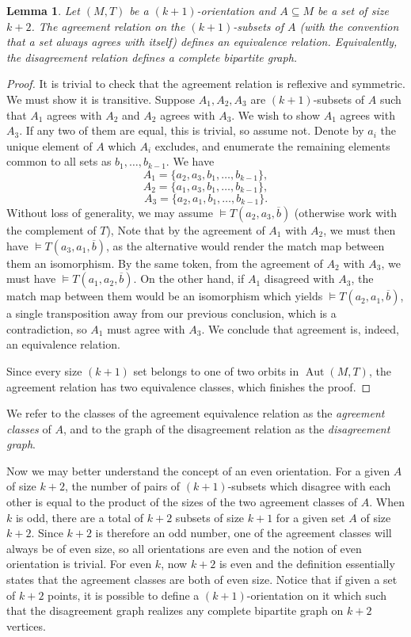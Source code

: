 \documentclass{amsart}
\newtheorem{lemma}[theorem]{Lemma}
\newcommand{\set}[1]{\{#1 \}}
\DeclareMathOperator{\Aut}{Aut}
\begin{document}
\begin{lemma}
    Let $(M, T)$ be a $(k+1)$-orientation and $A \subseteq M$ be a set of size $k+2$. The agreement relation on the $(k+1)$-subsets of $A$ (with the convention that a set always agrees with itself) defines an equivalence relation. Equivalently, the disagreement relation defines a complete bipartite graph.
\end{lemma}
\begin{proof}
    It is trivial to check that the agreement relation is reflexive and symmetric. We must show it is transitive. Suppose $A_1, A_2, A_3$ are $(k+1)$-subsets of $A$ such that $A_1$ agrees with $A_2$ and $A_2$ agrees with $A_3$. We wish to show $A_1$ agrees with $A_3$. If any two of them are equal, this is trivial, so assume not. Denote by $a_{i}$ the unique element of $A$ which $A_i$ excludes, and enumerate the remaining elements common to all sets as $b_1, \dots, b_{k-1}$. We have
    $$A_1 = \set{a_2, a_3,b_1, \dots, b_{k-1}},$$
    $$A_2 = \set{a_1, a_3,b_1, \dots, b_{k-1}},$$
    $$A_3 = \set{a_2, a_1,b_1, \dots, b_{k-1}}.$$
    Without loss of generality, we may assume $\models T(a_{2}, a_{3}, \overline{b})$ (otherwise work with the complement of $T$), Note that by the agreement of $A_1$ with $A_2$, we must then have $\models T(a_{3}, a_{1}, \overline{b})$, as the alternative would render the match map  between them an isomorphism. By the same token, from the agreement of $A_2$ with $A_3$, we must have $\models T(a_1, a_2, \overline{b})$. On the other hand, if $A_1$ disagreed with $A_3$, the match map between them would be an isomorphism which yields $\models T(a_2, a_1, \overline{b})$, a single transposition away from our previous conclusion, which is a contradiction, so $A_1$ must agree with $A_3$. We conclude that agreement is, indeed, an equivalence relation.
    
    Since every size $(k+1)$ set belongs to one of two orbits in $\Aut(M, T)$, the agreement relation has two equivalence classes, which finishes the proof.
\end{proof}

We refer to the classes of the agreement equivalence relation as the \emph{agreement classes} of $A$, and to the graph of the disagreement relation as the \emph{disagreement graph}.

Now we may better understand the concept of an even orientation. For a given $A$ of size $k+2$, the number of pairs of $(k+1)$-subsets which disagree with each other is equal to the product of the sizes of the two agreement classes of $A$. When $k$ is odd, there are a total of $k+2$ subsets of size $k+1$ for a given set $A$ of size $k+2$. Since $k+2$ is therefore an odd number, one of the agreement classes will always be of even size, so all orientations are even and the notion of even orientation is trivial. For even $k$, now $k+2$ is even and the definition essentially states that the agreement classes are both of even size. Notice that if given a set of $k+2$ points, it is possible to define a $(k+1)$-orientation on it which such that the disagreement graph realizes any complete bipartite graph on $k+2$ vertices.
\end{document}
